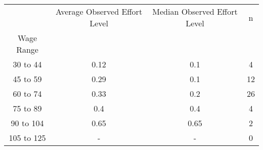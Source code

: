 \begin{tabular}{cccc}
\toprule
{} & Average Observed Effort Level & Median Observed Effort Level &   n \\
Wage Range &                               &                              &     \\
\midrule
30 to 44   &                          0.12 &                          0.1 &   4 \\
45 to 59   &                          0.29 &                          0.1 &  12 \\
60 to 74   &                          0.33 &                          0.2 &  26 \\
75 to 89   &                           0.4 &                          0.4 &   4 \\
90 to 104  &                          0.65 &                         0.65 &   2 \\
105 to 125 &                             - &                            - &   0 \\
\bottomrule
\end{tabular}
